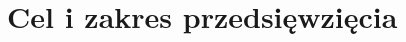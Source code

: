 \documentclass[../main.tex]{subfiles}
\begin{document}
\section{Cel i zakres przedsięwzięcia}
\end{document}
